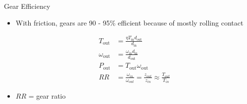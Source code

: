 \documentclass[10pt, svgnames]{beamer}
\begin{document}
\begin{frame}[label={sec:org53ae3fd}]{Gear Efficiency}
\begin{itemize}
\item With friction, gears are 90 - 95\% efficient because of mostly rolling
contact

\begin{align*}
  T_{\text{out}} &= \frac{\eta T_{\text{in}} d_{\text{out}}}{d_{\text{in}}} \\
  \omega_{\text{out}} &= \frac{\omega_{\text{in}} d_{\text{in}}}{d_{\text{out}}} \\
  P_{\text{out}} &= T_{\text{out}} \omega_{\text{out}} \\
  RR &= \frac{\omega_{in}}{\omega_{out}} = \frac{z_{out}}{z_{in}} \approx \frac{T_{out}}{T_{in}}
\end{align*}

\item \(RR\) = gear ratio
\end{itemize}
\end{frame}
\end{document}
